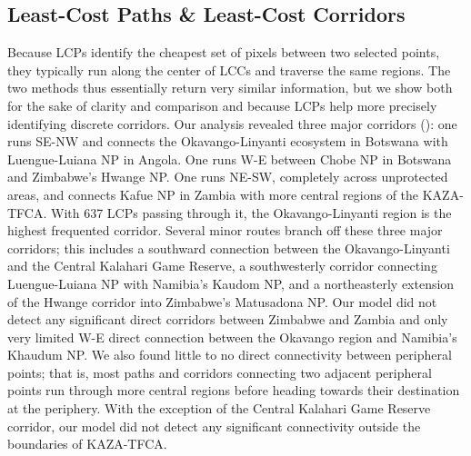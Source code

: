 \documentclass[abstract=on,10pt,a4paper,bibliography=totocnumbered]{scrartcl}
\begin{document}
\subsection{Least-Cost Paths \& Least-Cost Corridors}
Because LCPs identify the cheapest set of pixels between two selected points,
they typically run along the center of LCCs and traverse the same regions. The
two methods thus essentially return very similar information, but we show both
for the sake of clarity and comparison and because LCPs help more precisely
identifying discrete corridors. Our analysis revealed three major corridors
(): one runs SE-NW and connects the Okavango-Linyanti ecosystem
in Botswana with Luengue-Luiana NP in Angola. One runs W-E between Chobe NP in
Botswana and Zimbabwe’s Hwange NP. One runs NE-SW, completely across unprotected
areas, and connects Kafue NP in Zambia with more central regions of the
KAZA-TFCA. With 637 LCPs passing through it, the Okavango-Linyanti region is the
highest frequented corridor. Several minor routes branch off these three major
corridors; this includes a southward connection between the Okavango-Linyanti
and the Central Kalahari Game Reserve, a southwesterly corridor connecting
Luengue-Luiana NP with Namibia’s Kaudom NP, and a northeasterly extension of the
Hwange corridor into Zimbabwe’s Matusadona NP. Our model did not detect any
significant direct corridors between Zimbabwe and Zambia and only very limited
W-E direct connection between the Okavango region and Namibia’s Khaudum NP. We
also found little to no direct connectivity between peripheral points; that is,
most paths and corridors connecting two adjacent peripheral points run through
more central regions before heading towards their destination at the periphery.
With the exception of the Central Kalahari Game Reserve corridor, our model did
not detect any significant connectivity outside the boundaries of KAZA-TFCA.
\end{document}
